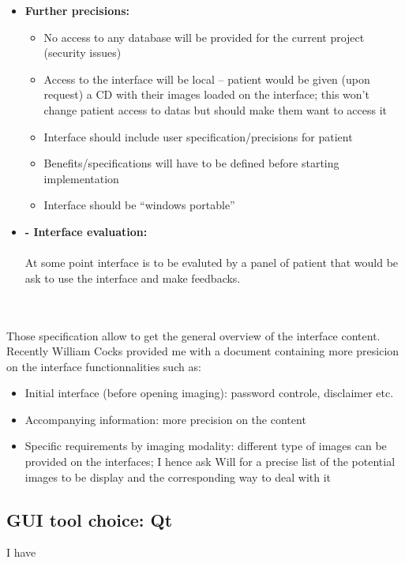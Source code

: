 \documentclass[12pt,twoside]{article}
\begin{document}
\begin{itemize}
\begin{itemize}
\end{itemize}

\item \textbf{Further precisions:}
\begin{itemize}
\item No access to any database will be provided for the current project (security issues) 
\item Access to the interface will be local – patient would be given (upon request) a CD with their images loaded on the interface; this won’t change patient access to datas but should make them want to access it
\item Interface should include user specification/precisions for patient 
\item Benefits/specifications will have to be defined before starting implementation
\item Interface should be “windows portable” 
\end{itemize}

\item \textbf{-	Interface evaluation:} \\ \\
At some point interface is to be evaluted by a panel of patient that would be ask to use the interface and make feedbacks.


\end{itemize} \\ \\

Those specification allow to get the general overview of the interface content. Recently William Cocks provided me with a document containing more presicion on the interface functionnalities such as:
\begin{itemize}
\item Initial interface (before opening imaging): password controle, disclaimer etc.
\item Accompanying information: more precision on the content
\item Specific requirements by imaging modality: different type of images can be provided on the interfaces; I hence ask Will for a precise list of the potential images to be display and the corresponding way to deal with it
\end{itemize}

\subsection{GUI tool choice: Qt}
I have
\end{document}
